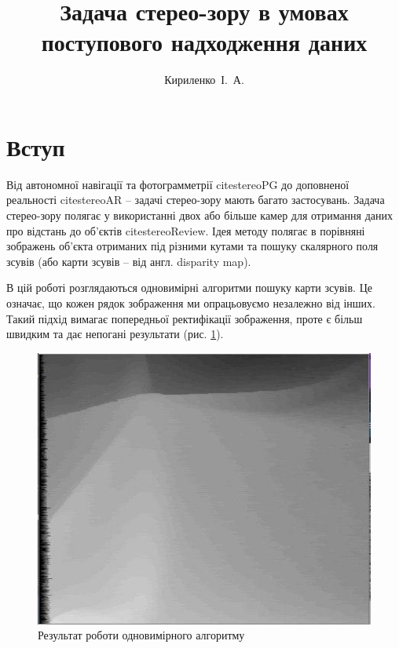 \documentclass{ConfFTI}
\title{Задача стерео-зору в умовах поступового надходження даних }
\author[\email]{Кириленко~І.~А.}{1} %
\affiliation{\ntuuipt}{1}
\begin{document}
	


\section*{Вступ}
	Від автономної навігації \cite{stereoNav} та фотограмметрії cite{stereoPG} до доповненої реальності cite{stereoAR} -- задачі стерео-зору мають багато застосувань. Задача стерео-зору полягає у використанні двох або більше камер для отримання даних про відстань до об'єктів cite{stereoReview}. Ідея методу полягає в порівняні зображень об'єкта отриманих під різними кутами та пошуку скалярного поля зсувів (або карти зсувів -- від англ. disparity map).
	
В цій роботі розглядаються одновимірні алгоритми пошуку карти зсувів. Це означає, що кожен рядок зображення ми опрацьовуємо незалежно від інших. Такий підхід вимагає попередньої ректифікації зображення, проте є більш швидким та дає непогані результати (рис. \ref{results}).
\begin{figure}[h!]
	\centering
	\includegraphics[scale = 0.3]{result}
	\caption{Результат роботи одновимірного алгоритму}
	\label{results}
\end{figure}
\end{document}

